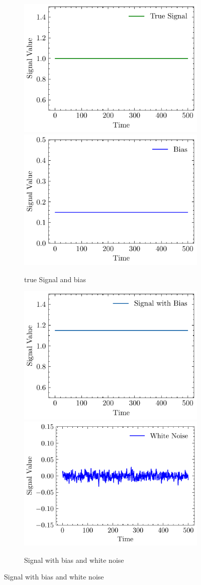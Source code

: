 \begin{figure}

  \begin{subfigure}{\linewidth}
  \includegraphics[width=.5\linewidth]{images/fig_chapter2/noise_figs/true_signal.pdf}\hfill
  \includegraphics[width=.5\linewidth]{images/fig_chapter2/noise_figs/bias.pdf}
  \caption{true Signal and bias}
  \end{subfigure}\par\medskip
  
  \begin{subfigure}{\linewidth}
  \includegraphics[width=.5\linewidth]{images/fig_chapter2/noise_figs/signal_bias.pdf}\hfill
  \includegraphics[width=.5\linewidth]{images/fig_chapter2/noise_figs/white_noise.pdf}
  \caption{Signal with bias and white noise}
  \end{subfigure}\par\medskip
  

\end{figure}
